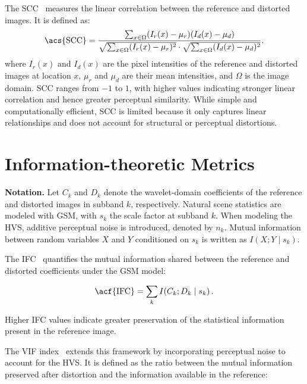 The \acf{SCC}~\cite{eskicioglu1995scc} measures the linear correlation between the reference and distorted images. It is defined as:
\begin{equation}
\text{\acs{SCC}} = \frac{\sum_{x \in \Omega} (I_r(x) - \mu_r)(I_d(x) - \mu_d)}{\sqrt{\sum_{x \in \Omega} (I_r(x) - \mu_r)^2} \cdot \sqrt{\sum_{x \in \Omega} (I_d(x) - \mu_d)^2}},
\end{equation}
where $I_r(x)$ and $I_d(x)$ are the pixel intensities of the reference and distorted images at location $x$, $\mu_r$ and $\mu_d$ are their mean intensities, and $\Omega$ is the image domain. \acs{SCC} ranges from $-1$ to $1$, with higher values indicating stronger linear correlation and hence greater perceptual similarity. While simple and computationally efficient, \acs{SCC} is limited because it only captures linear relationships and does not account for structural or perceptual distortions.

\section{Information-theoretic Metrics}\label{app:sec:information_theoretic_metrics}

\noindent\textbf{Notation.} 
Let $C_k$ and $D_k$ denote the wavelet-domain coefficients of the reference and distorted images in subband $k$, respectively. Natural scene statistics are modeled with \acf{GSM}, with $s_k$ the scale factor at subband $k$. When modeling the \acs{HVS}, additive perceptual noise is introduced, denoted by $n_k$. Mutual information between random variables $X$ and $Y$ conditioned on $s_k$ is written as $I(X;Y \mid s_k)$.

The \acf{IFC}~\cite{sheikh2005ifc} quantifies the mutual information shared between the reference and distorted coefficients under the \acs{GSM} model:

\begin{equation}
\text{\acf{IFC}} = \sum_{k} I\!\left(C_k; D_k \mid s_k\right).
\end{equation}

Higher \acs{IFC} values indicate greater preservation of the statistical information present in the reference image.

The \acf{VIF} index~\cite{sheikh2006vif} extends this framework by incorporating perceptual noise to account for the \acs{HVS}. It is defined as the ratio between the mutual information preserved after distortion and the information available in the reference:


